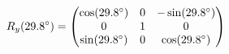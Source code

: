 \documentclass[preview]{standalone}
\begin{document}
\begin{align*}
\special{dvisvgm:raw <g id='unique000'>}R_y(29.8^\circ) = \begin{pmatrix} \cos(29.8^\circ) & 0 & -\sin(29.8^\circ) \\ 0 & 1 & 0 \\ \sin(29.8^\circ) & 0 & \cos(29.8^\circ) \end{pmatrix}\special{dvisvgm:raw </g>}
\end{align*}
\end{document}
